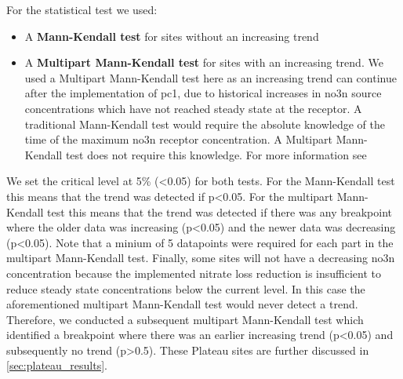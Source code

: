 For the statistical test we used:
\begin{itemize}
    \item A \textbf{Mann-Kendall test} for sites without an increasing trend
    \item A \textbf{Multipart Mann-Kendall test} for sites with an increasing trend. We used a Multipart Mann-Kendall test here as an increasing trend can continue after the implementation of \gls{pc1}, due to historical increases in \gls{no3n} source concentrations which have not reached steady state at the receptor. A traditional Mann-Kendall test would require the absolute knowledge of the time of the maximum \gls{no3n} receptor concentration. A Multipart Mann-Kendall test does not require this knowledge. For more information see \citet{dumont_komanawakendall_stats_2023}
\end{itemize}

We set the critical level at 5\% (<0.05) for both tests.
For the Mann-Kendall test this means that the trend was detected if p<0.05. For the multipart Mann-Kendall test this means that the trend was detected if there was any breakpoint where the older data was increasing (p<0.05) and the newer data was decreasing (p<0.05).
Note that a minium of 5 datapoints were required for each part in the multipart Mann-Kendall test.
Finally, some sites will not have a decreasing \gls{no3n} concentration because the implemented nitrate loss reduction is insufficient to reduce steady state concentrations below the current level.
In this case the aforementioned multipart Mann-Kendall test would never detect a trend.
Therefore, we conducted a subsequent multipart Mann-Kendall test which identified a breakpoint where there was an earlier increasing trend (p<0.05) and subsequently no trend (p>0.5). These Plateau sites are further discussed in \autoref{sec:plateau_results}.

